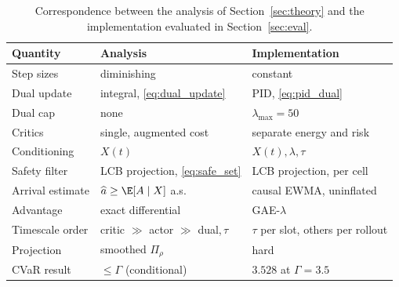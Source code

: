 \begin{table}[t]
  \centering
  \caption{Correspondence between the analysis of Section~\ref{sec:theory} and the implementation evaluated in Section~\ref{sec:eval}.}
  \label{tab:theory_impl}
  \scriptsize
  \setlength{\tabcolsep}{3pt}
  \begin{tabular}{@{}lll@{}}
    \toprule
    Quantity & Analysis & Implementation \\
    \midrule
    Step sizes & diminishing & constant \\
    Dual update & integral, \eqref{eq:dual_update} & PID, \eqref{eq:pid_dual} \\
    Dual cap & none & $\lambda_{\max}\!=\!50$ \\
    Critics & single, augmented cost & separate energy and risk \\
    Conditioning & $X(t)$ & $X(t),\lambda,\tau$ \\
    Safety filter & LCB projection, \eqref{eq:safe_set} & LCB projection, per cell \\
    Arrival estimate & $\widehat a\ge\E[A\mid X]$ a.s. & causal EWMA, uninflated \\
    Advantage & exact differential & GAE-$\lambda$ \\
    Timescale order & critic $\gg$ actor $\gg$ dual,\,$\tau$ & $\tau$ per slot, others per rollout \\
    Projection & smoothed $\Pi_\rho$ & hard \\
    CVaR result & $\le\Gamma$ (conditional) & $3.528$ at $\Gamma\!=\!3.5$ \\
    \bottomrule
  \end{tabular}
\end{table}
